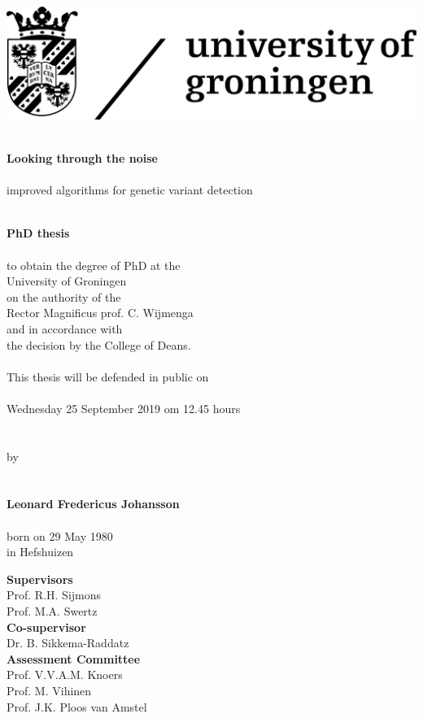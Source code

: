 \begin{flushleft}
	\includegraphics[scale=0.8]{img/rugr_logoen_zwart_rgb}
\end{flushleft}

\begin{center}
	\linespread{1.00} %
	~\\
	\huge
	\textbf{Looking through the noise}
	\\~\\
	\large
	improved algorithms for genetic variant detection
	\\~\\
	\linespread{1.05} %
	
	
	\large
	\textbf{PhD thesis}
	\\~\\
	\normalsize
	to obtain the degree of PhD at the\\
	University of Groningen\\
	on the authority of the\\
	Rector Magnificus prof. C. Wijmenga\\
	and in accordance with \\
	the decision by the College of Deans.
	\\~\\
	This thesis will be defended in public on
	\\~\\
	Wednesday 25 September 2019 om 12.45 hours 
	\\~\\~\\
	by
	\\~\\~\\
	\large
	\textbf{Leonard Fredericus Johansson}
	\\~\\
	\normalsize
	born on 29 May 1980\\
	in Hefshuizen\\
	\normalsize
\end{center}

\clearpage

\noindent
\textbf{Supervisors}\\
Prof. R.H. Sijmons \\
Prof. M.A. Swertz \\

\noindent
\textbf{Co-supervisor}\\
Dr. B. Sikkema-Raddatz \\

\noindent
\textbf{Assessment Committee}\\
Prof. V.V.A.M. Knoers\\
Prof. M. Vihinen\\
Prof. J.K. Ploos van Amstel\\
